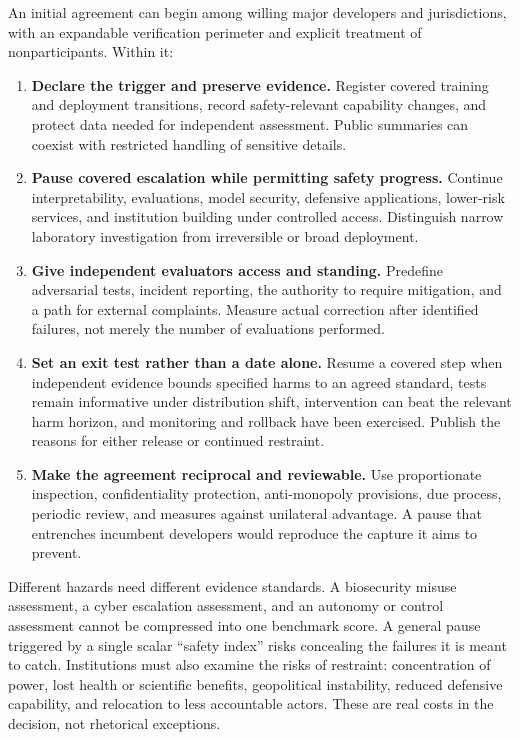 \documentclass[11pt]{article}
\begin{document}
An initial agreement can begin among willing major developers and jurisdictions, with an expandable verification perimeter and explicit treatment of nonparticipants. Within it:
\begin{enumerate}[leftmargin=*]
\item \textbf{Declare the trigger and preserve evidence.} Register covered training and deployment transitions, record safety-relevant capability changes, and protect data needed for independent assessment. Public summaries can coexist with restricted handling of sensitive details.
\item \textbf{Pause covered escalation while permitting safety progress.} Continue interpretability, evaluations, model security, defensive applications, lower-risk services, and institution building under controlled access. Distinguish narrow laboratory investigation from irreversible or broad deployment.
\item \textbf{Give independent evaluators access and standing.} Predefine adversarial tests, incident reporting, the authority to require mitigation, and a path for external complaints. Measure actual correction after identified failures, not merely the number of evaluations performed.
\item \textbf{Set an exit test rather than a date alone.} Resume a covered step when independent evidence bounds specified harms to an agreed standard, tests remain informative under distribution shift, intervention can beat the relevant harm horizon, and monitoring and rollback have been exercised. Publish the reasons for either release or continued restraint.
\item \textbf{Make the agreement reciprocal and reviewable.} Use proportionate inspection, confidentiality protection, anti-monopoly provisions, due process, periodic review, and measures against unilateral advantage. A pause that entrenches incumbent developers would reproduce the capture it aims to prevent.
\end{enumerate}

Different hazards need different evidence standards. A biosecurity misuse assessment, a cyber escalation assessment, and an autonomy or control assessment cannot be compressed into one benchmark score. A general pause triggered by a single scalar ``safety index'' risks concealing the failures it is meant to catch. Institutions must also examine the risks of restraint: concentration of power, lost health or scientific benefits, geopolitical instability, reduced defensive capability, and relocation to less accountable actors. These are real costs in the decision, not rhetorical exceptions.
\end{document}

